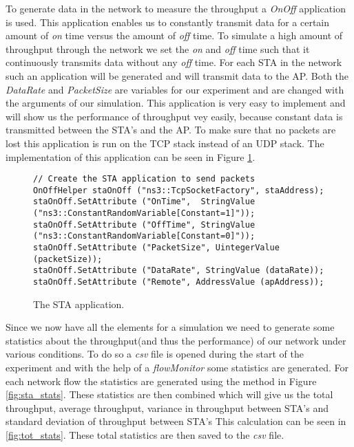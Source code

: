 \documentclass[]{article}
\begin{document}
To generate data in the network to measure the throughput a \textit{OnOff} application is used.
This application enables us to constantly transmit data for a certain amount of \textit{on} time versus the amount of \textit{off} time.
To simulate a high amount of throughput through the network we set the \textit{on} and \textit{off} time such that it continuously transmits data without any \textit{off} time.
For each STA in the network such an application will be generated and will transmit data to the AP.
Both the \textit{DataRate} and \textit{PacketSize} are variables for our experiment and are changed with the arguments of our simulation.
This application is very easy to implement and will show us the performance of throughput vey easily, because constant data is transmitted between the STA's and the AP.
To make sure that no packets are lost this application is run on the TCP stack instead of an UDP stack.
The implementation of this application can be seen in Figure \ref{fig:sta_app}.

\begin{figure}[H]
\begin{lstlisting}[frame=bt]
// Create the STA application to send packets
OnOffHelper staOnOff ("ns3::TcpSocketFactory", staAddress);
staOnOff.SetAttribute ("OnTime",  StringValue ("ns3::ConstantRandomVariable[Constant=1]"));
staOnOff.SetAttribute ("OffTime", StringValue ("ns3::ConstantRandomVariable[Constant=0]"));
staOnOff.SetAttribute ("PacketSize", UintegerValue (packetSize));
staOnOff.SetAttribute ("DataRate", StringValue (dataRate));
staOnOff.SetAttribute ("Remote", AddressValue (apAddress));
\end{lstlisting}
\caption{The STA application.\label{fig:sta_app}}
\end{figure}

Since we now have all the elements for a simulation we need to generate some statistics about the throughput(and thus the performance) of our network under various conditions.
To do so a \textit{csv} file is opened during the start of the experiment and with the help of a \textit{flowMonitor} some statistics are generated.
For each network flow the statistics are generated using the method in Figure \ref{fig:sta_stats}.
These statistics are then combined which will give us the total throughput, average throughput, variance in throughput between STA's and standard deviation of throughput between STA's
This calculation can be seen in \ref{fig:tot_stats}.
These total statistics are then saved to the \textit{csv} file.
\end{document}
